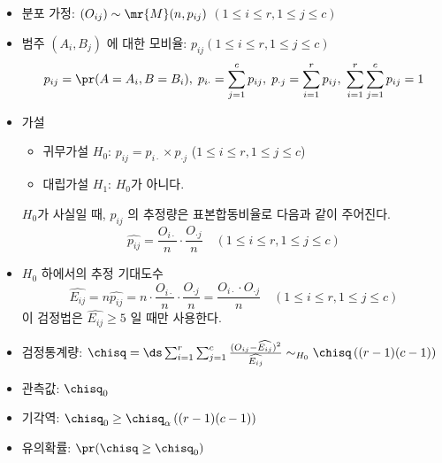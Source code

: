 {\begin{itemize}
\begin{center}
\begin{tabular}{c|c|c|c|c|c}
			   합계    &        $O_{\cdot 1}$         &        $O_{\cdot 2}$         & $\cdots$ &        $O_{\cdot c}$         &     $n$      \\ \hline
		\end{tabular}
	\end{center}
	\item 분포 가정: $(O_{ij})\sim \mr{M}(n, p_{ij})$ \quad $(1\leq i\leq r, 1\leq j\leq c)$ 
	\item 범주 $(A_i, B_j)$ 에 대한 모비율: $p_{ij}$\quad $(1\leq i\leq r, 1\leq j\leq c)$
	$$p_{ij} = \pr(A=A_i, B=B_i),\; p_{i\cdot} = \sum_{j=1}^c p_{ij},\; p_{\cdot j} = \sum_{i=1}^r p_{ij}, \; \sum_{i=1}^r\sum_{j=1}^c p_{ij} = 1$$
	\item 가설
	\begin{itemize}
		\item 귀무가설 $H_0$: $p_{ij} = p_{i\cdot} \times p_{\cdot j}$ \quad ($1\leq i\leq r, 1\leq j\leq c$)
		\item 대립가설 $H_1$: $H_0$가 아니다.
	\end{itemize}
	$H_0$가 사실일 때, $p_{ij}$ 의 추정량은 표본합동비율로 다음과 같이 주어진다.
	$$\widehat{p_{ij}} = \frac{O_{i\cdot}}{n}\cdot \frac{O_{\cdot j}}{n} \quad (1\leq i\leq r, 1\leq j\leq c)$$
	\item $H_0$ 하에서의 추정 기대도수
	$$\widehat{E_{ij}}=n\widehat{p_{ij}} = n\cdot \frac{O_{i\cdot}}{n}\cdot \frac{O_{\cdot j}}{n} = \frac{O_{i\cdot}\cdot O_{\cdot j}}{n} \quad (1\leq i\leq r, 1\leq j\leq c)$$
	이 검정법은 $\widehat{E_{ij}}\geq 5$ 일 때만 사용한다.
		\item 검정통계량: $\chisq = \ds \sum_{i=1}^r \sum_{j=1}^c \frac{(O_{ij}-\widehat{E_{ij}})^2}{\widehat{E_{ij}}} \sim_{H_0} \chisq\left((r-1)(c-1)\right)$
	\item 관측값: $\chisq_0$
	\item 기각역: $\chisq_0 \geq \chisq_{\alpha}\left((r-1)(c-1)\right)$
	\item 유의확률: $\pr(\chisq \geq \chisq_0)$
\end{itemize}
}

